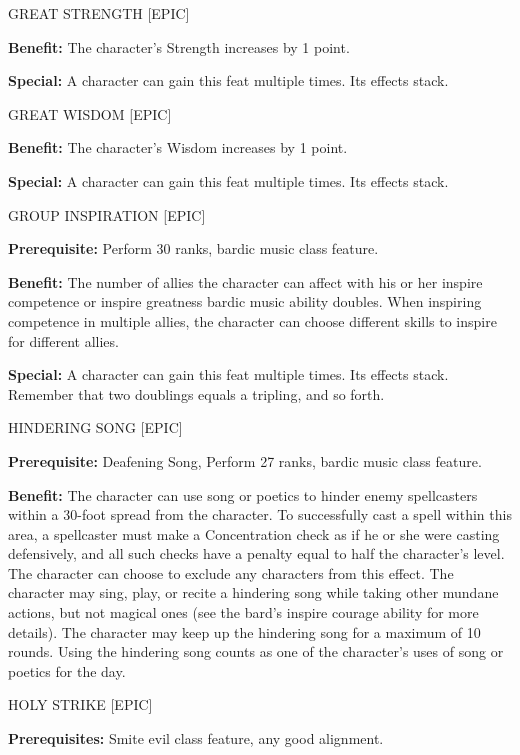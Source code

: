 \documentclass{article}
\begin{document}
\vspace{12pt}
GREAT STRENGTH [EPIC] 

\textbf{Benefit:} The character's Strength increases by 1 point. 

\textbf{Special:} A character can gain this feat multiple times. Its effects stack. 

\vspace{12pt}
GREAT WISDOM [EPIC] 

\textbf{Benefit:} The character's Wisdom increases by 1 point. 

\textbf{Special:} A character can gain this feat multiple times. Its effects stack. 

\vspace{12pt}
GROUP INSPIRATION [EPIC] 

\textbf{Prerequisite:} Perform 30 ranks, bardic music class feature. 

\textbf{Benefit:} The number of allies the character can affect with his or her 
inspire competence or inspire greatness bardic music ability doubles. When inspiring 
competence in multiple allies, the character can choose different skills to inspire 
for different allies. 

\textbf{Special:} A character can gain this feat multiple times. Its effects stack. 
Remember that two doublings equals a tripling, and so forth. 

\vspace{12pt}
HINDERING SONG [EPIC] 

\textbf{Prerequisite:} Deafening Song, Perform 27 ranks, bardic music class feature. 

\textbf{Benefit:} The character can use song or poetics to hinder enemy spellcasters 
within a 30-foot spread from the character. To successfully cast a spell within 
this area, a spellcaster must make a Concentration check as if he or she were casting 
defensively, and all such checks have a penalty equal to half the character's level. 
The character can choose to exclude any characters from this effect. The character 
may sing, play, or recite a hindering song while taking other mundane actions, 
but not magical ones (see the bard's inspire courage ability for more details). 
The character may keep up the hindering song for a maximum of 10 rounds. Using 
the hindering song counts as one of the character's uses of song or poetics for 
the day. 

\vspace{12pt}
HOLY STRIKE [EPIC] 

\textbf{Prerequisites:} Smite evil class feature, any good alignment. 
\end{document}
